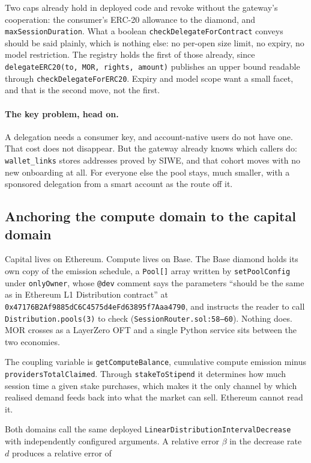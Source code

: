 \documentclass[11pt,a4paper]{article}
\newcommand{\code}[1]{\texttt{\small #1}}
\begin{document}
Two caps already hold in deployed code and revoke without the gateway's
cooperation: the consumer's ERC-20 allowance to the diamond, and
\code{maxSessionDuration}. What a boolean \code{checkDelegateForContract}
conveys should be said plainly, which is nothing else: no per-open size limit,
no expiry, no model restriction. The registry holds the first of those already,
since \code{delegateERC20(to, MOR, rights, amount)} publishes an upper bound
readable through \code{checkDelegateForERC20}. Expiry and model scope want a
small facet, and that is the second move, not the first.

\paragraph{The key problem, head on.} A delegation needs a consumer key, and
account-native users do not have one. That cost does not disappear. But the
gateway already knows which callers do: \code{wallet\_links} stores addresses
proved by SIWE, and that cohort moves with no new onboarding at all. For
everyone else the pool stays, much smaller, with a sponsored delegation from a
smart account as the route off it.

\subsection{Anchoring the compute domain to the capital domain}
\label{sec:anchor}

Capital lives on Ethereum. Compute lives on Base. The Base diamond holds its own
copy of the emission schedule, a \code{Pool[]} array written by
\code{setPoolConfig} under \code{onlyOwner}, whose \code{@dev} comment says the
parameters ``should be the same as in Ethereum L1 Distribution contract'' at
\code{0x47176B2Af9885dC6C4575d4eFd63895f7Aaa4790}, and instructs the reader to
call \code{Distribution.pools(3)} to check
(\code{SessionRouter.sol:58--60}). Nothing does. MOR crosses as a LayerZero OFT
and a single Python service sits between the two economies.

The coupling variable is \code{getComputeBalance}, cumulative compute emission
minus \code{providersTotalClaimed}. Through \code{stakeToStipend} it determines
how much session time a given stake purchases, which makes it the only channel
by which realised demand feeds back into what the market can sell. Ethereum
cannot read it.

Both domains call the same deployed \code{LinearDistributionIntervalDecrease}
with independently configured arguments. A relative error $\beta$ in the
decrease rate $d$ produces a relative error of
\end{document}
